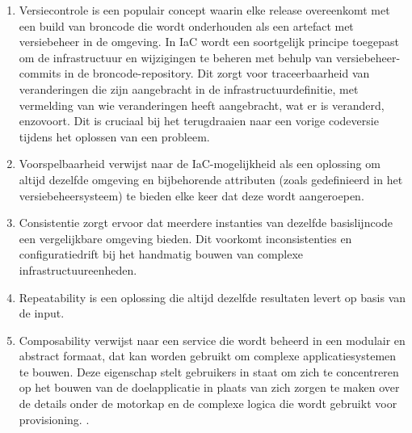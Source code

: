 \begin{enumerate}
  \item Versiecontrole is een populair concept waarin elke release overeenkomt met een build van broncode die wordt onderhouden als een artefact met versiebeheer in de omgeving. In IaC wordt een soortgelijk principe toegepast om de infrastructuur en wijzigingen te beheren met behulp van versiebeheer-commits in de broncode-repository. Dit zorgt voor traceerbaarheid van veranderingen die zijn aangebracht in de infrastructuurdefinitie, met vermelding van wie veranderingen heeft aangebracht, wat er is veranderd, enzovoort. Dit is cruciaal bij het terugdraaien naar een vorige codeversie tijdens het oplossen van een probleem.

  \item Voorspelbaarheid verwijst naar de IaC-mogelijkheid als een oplossing om altijd dezelfde omgeving en bijbehorende attributen (zoals gedefinieerd in het versiebeheersysteem) te bieden elke keer dat deze wordt aangeroepen.

  \item Consistentie zorgt ervoor dat meerdere instanties van dezelfde basislijncode een vergelijkbare omgeving bieden.  Dit voorkomt inconsistenties en configuratiedrift bij het handmatig bouwen van complexe infrastructuureenheden.

  \item Repeatability is een oplossing die altijd dezelfde resultaten levert op basis van de input.

  \item Composability verwijst naar een service die wordt beheerd in een modulair en abstract formaat, dat kan worden gebruikt om complexe applicatiesystemen te bouwen. Deze eigenschap stelt gebruikers in staat om zich te concentreren op het bouwen van de doelapplicatie in plaats van zich zorgen te maken over de details onder de motorkap en de complexe logica die wordt gebruikt voor provisioning.
  \autocite{Achar2021}.
\end{enumerate}

